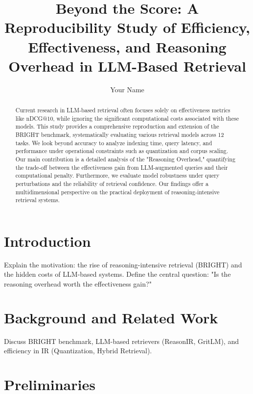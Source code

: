 \documentclass[sigconf]{acmart}
\begin{document}
\title{Beyond the Score: A Reproducibility Study of Efficiency, Effectiveness, and Reasoning Overhead in LLM-Based Retrieval}

\author{Your Name}

\begin{abstract}
Current research in LLM-based retrieval often focuses solely on effectiveness metrics like nDCG@10, while ignoring the significant computational costs associated with these models. This study provides a comprehensive reproduction and extension of the BRIGHT benchmark, systematically evaluating various retrieval models across 12 tasks. We look beyond accuracy to analyze indexing time, query latency, and performance under operational constraints such as quantization and corpus scaling. Our main contribution is a detailed analysis of the "Reasoning Overhead," quantifying the trade-off between the effectiveness gain from LLM-augmented queries and their computational penalty. Furthermore, we evaluate model robustness under query perturbations and the reliability of retrieval confidence. Our findings offer a multidimensional perspective on the practical deployment of reasoning-intensive retrieval systems.
\end{abstract}


\maketitle

\section{Introduction}
Explain the motivation: the rise of reasoning-intensive retrieval (BRIGHT) and the hidden costs of LLM-based systems. Define the central question: "Is the reasoning overhead worth the effectiveness gain?"

\section{Background and Related Work}
Discuss BRIGHT benchmark, LLM-based retrievers (ReasonIR, GritLM), and efficiency in IR (Quantization, Hybrid Retrieval).

\section{Preliminaries}
\end{document}
